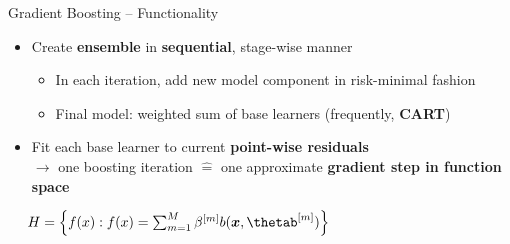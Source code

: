 \begin{frame}{Gradient Boosting -- Functionality}

 

\medskip


\begin{itemize}
  \item Create \textbf{ensemble} in \textbf{sequential}, stage-wise manner
  \begin{itemize}
    \item In each iteration, add new model component in risk-minimal fashion
    \item Final model: weighted sum of base learners (frequently, \textbf{CART})
  \end{itemize}
  \item Fit each base learner to current \textbf{point-wise residuals} 
  \\ $\rightarrow$ one boosting iteration $\widehat{=}$ one approximate 
  \textbf{gradient step in function space}
\end{itemize}

\medskip

 ~~
$\Hspace = \left\{ \fx: \fx = \sum_{m = 1}^M \betam b(\xv, \thetam) \right\}$


\end{frame}
